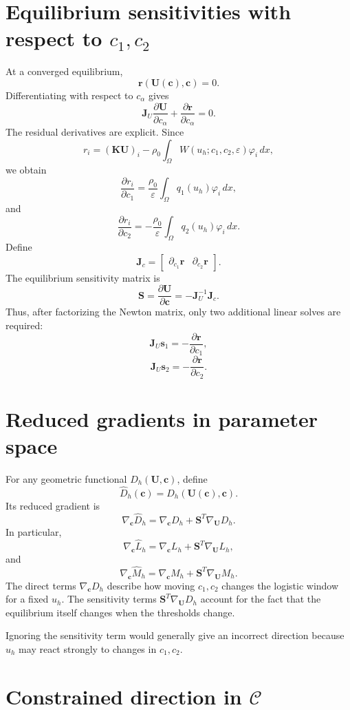 \documentclass[11pt]{article}
\newcommand{\cC}{\mathcal{C}}
\newcommand{\bU}{\mathbf{U}}
\newcommand{\bc}{\mathbf{c}}
\newcommand{\br}{\mathbf{r}}
\newcommand{\bK}{\mathbf{K}}
\newcommand{\bJ}{\mathbf{J}}
\newcommand{\bS}{\mathbf{S}}
\begin{document}
\section{Equilibrium sensitivities with respect to $c_1,c_2$}

At a converged equilibrium,
\[
\br(\bU(\bc),\bc)=0.
\]
Differentiating with respect to $c_\alpha$ gives
\[
\bJ_U
\frac{\partial\bU}{\partial c_\alpha}
+
\frac{\partial\br}{\partial c_\alpha}
=
0.
\]
The residual derivatives are explicit. Since
\[
r_i
=
(\bK\bU)_i
-
\rho_0
\int_\Omega W(u_h;c_1,c_2,\varepsilon)\varphi_i\,dx,
\]
we obtain
\[
\frac{\partial r_i}{\partial c_1}
=
\frac{\rho_0}{\varepsilon}
\int_\Omega q_1(u_h)\varphi_i\,dx,
\]
and
\[
\frac{\partial r_i}{\partial c_2}
=
-\frac{\rho_0}{\varepsilon}
\int_\Omega q_2(u_h)\varphi_i\,dx.
\]
Define
\[
\bJ_c
=
\begin{bmatrix}
\partial_{c_1}\br&
\partial_{c_2}\br
\end{bmatrix}.
\]
The equilibrium sensitivity matrix is
\[
\boxed{
\bS
=
\frac{\partial\bU}{\partial\bc}
=
-\bJ_U^{-1}\bJ_c.
}
\]
Thus, after factorizing the Newton matrix, only two additional linear solves are required:
\[
\bJ_U\mathbf{s}_1
=
-\frac{\partial\br}{\partial c_1},
\]
\[
\bJ_U\mathbf{s}_2
=
-\frac{\partial\br}{\partial c_2}.
\]

\section{Reduced gradients in parameter space}

For any geometric functional $D_h(\bU,\bc)$, define
\[
\widehat D_h(\bc)
=
D_h(\bU(\bc),\bc).
\]
Its reduced gradient is
\[
\boxed{
\nabla_{\bc}\widehat D_h
=
\nabla_{\bc}D_h
+
\bS^T\nabla_{\bU}D_h.
}
\]
In particular,
\[
\nabla_{\bc}\widehat L_h
=
\nabla_{\bc}L_h
+
\bS^T\nabla_{\bU}L_h,
\]
and
\[
\nabla_{\bc}\widehat M_h
=
\nabla_{\bc}M_h
+
\bS^T\nabla_{\bU}M_h.
\]
The direct terms $\nabla_{\bc}D_h$ describe how moving $c_1,c_2$ changes the logistic window for a fixed $u_h$. The sensitivity terms $\bS^T\nabla_{\bU}D_h$ account for the fact that the equilibrium itself changes when the thresholds change.

Ignoring the sensitivity term would generally give an incorrect direction because $u_h$ may react strongly to changes in $c_1,c_2$.

\section{Constrained direction in $\cC$}
\end{document}
